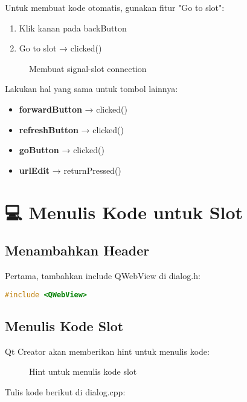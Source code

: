 Untuk membuat kode otomatis, gunakan fitur "Go to slot":

\begin{enumerate}
\item Klik kanan pada backButton
\item Go to slot → clicked()
\end{enumerate}

\begin{figure}[htbp]
\centering
{}
\caption{Membuat signal-slot connection}
\end{figure}

Lakukan hal yang sama untuk tombol lainnya:
\begin{itemize}
\item \textbf{forwardButton} → clicked()
\item \textbf{refreshButton} → clicked()
\item \textbf{goButton} → clicked()
\item \textbf{urlEdit} → returnPressed()
\end{itemize}

\section{💻 Menulis Kode untuk Slot}

\subsection{Menambahkan Header}

Pertama, tambahkan include QWebView di dialog.h:

\begin{lstlisting}[language=c++]
#include <QWebView>
\end{lstlisting}

\subsection{Menulis Kode Slot}

Qt Creator akan memberikan hint untuk menulis kode:

\begin{figure}[htbp]
\centering
{}
\caption{Hint untuk menulis kode slot}
\end{figure}

Tulis kode berikut di dialog.cpp:



